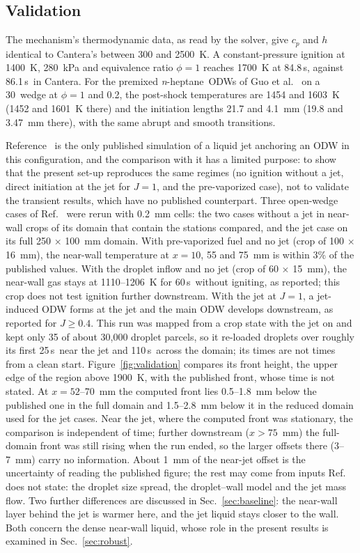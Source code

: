 \documentclass[aip,pof,preprint,amsmath,amssymb]{revtex4-2}
\newcommand{\us}{\,\textmu s}
\newcommand{\nh}{\textit{n}-heptane}
\begin{document}
\subsection{Validation}\label{sec:validation}

The mechanism's thermodynamic data, as read by the solver, give $c_p$ and $h$ identical to Cantera's \cite{Cantera} between 300 and 2500~K. A constant-pressure ignition at 1400~K, 280~kPa and equivalence ratio $\phi = 1$ reaches 1700~K at 84.8\us, against 86.1\us\ in Cantera. For the premixed \nh\ ODWs of Guo et al.\ \cite{Guo2023pci} on a 30\textdegree\ wedge at $\phi = 1$ and 0.2, the post-shock temperatures are 1454 and 1603~K (1452 and 1601~K there) and the initiation lengths 21.7 and 4.1~mm (19.8 and 3.47~mm there), with the same abrupt and smooth transitions.

Reference~ is the only published simulation of a liquid jet anchoring an ODW in this configuration, and the comparison with it has a limited purpose: to show that the present set-up reproduces the same regimes (no ignition without a jet, direct initiation at the jet for $J = 1$, and the pre-vaporized case), not to validate the transient results, which have no published counterpart. Three open-wedge cases of Ref.~ were rerun with 0.2~mm cells: the two cases without a jet in near-wall crops of its domain that contain the stations compared, and the jet case on its full 250 $\times$ 100~mm domain. With pre-vaporized fuel and no jet (crop of 100 $\times$ 16~mm), the near-wall temperature at $x = 10$, 55 and 75~mm is within 3\% of the published values. With the droplet inflow and no jet (crop of 60 $\times$ 15~mm), the near-wall gas stays at 1110--1206~K for 60\us\ without igniting, as reported; this crop does not test ignition further downstream. With the jet at $J = 1$, a jet-induced ODW forms at the jet and the main ODW develops downstream, as reported for $J \ge 0.4$. This run was mapped from a crop state with the jet on and kept only 35 of about 30,000 droplet parcels, so it re-loaded droplets over roughly its first 25\us\ near the jet and 110\us\ across the domain; its times are not times from a clean start. Figure~\ref{fig:validation} compares its front height, the upper edge of the region above 1900~K, with the published front, whose time is not stated. At $x = 52$--70~mm the computed front lies 0.5--1.8~mm below the published one in the full domain and 1.5--2.8~mm below it in the reduced domain used for the jet cases. Near the jet, where the computed front was stationary, the comparison is independent of time; further downstream ($x > 75$~mm) the full-domain front was still rising when the run ended, so the larger offsets there (3--7~mm) carry no information. About 1~mm of the near-jet offset is the uncertainty of reading the published figure; the rest may come from inputs Ref.~ does not state: the droplet size spread, the droplet--wall model and the jet mass flow. Two further differences are discussed in Sec.~\ref{sec:baseline}: the near-wall layer behind the jet is warmer here, and the jet liquid stays closer to the wall. Both concern the dense near-wall liquid, whose role in the present results is examined in Sec.~\ref{sec:robust}.
\end{document}
